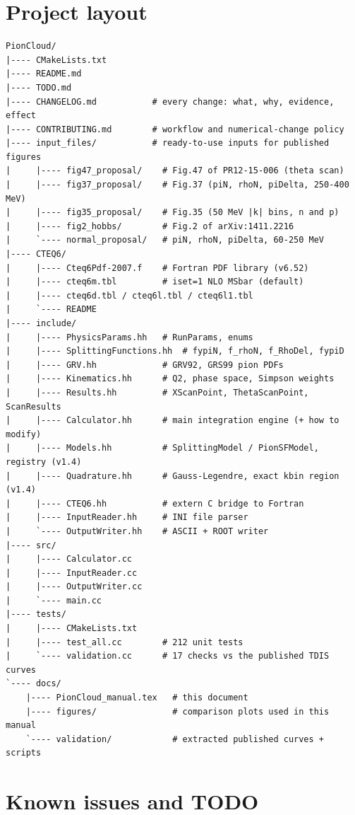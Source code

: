 \documentclass[11pt,a4paper]{article}
\begin{document}
\section{Project layout}

\begin{lstlisting}[style=bashstyle]
PionCloud/
|---- CMakeLists.txt
|---- README.md
|---- TODO.md
|---- CHANGELOG.md           # every change: what, why, evidence, effect
|---- CONTRIBUTING.md        # workflow and numerical-change policy
|---- input_files/           # ready-to-use inputs for published figures
|     |---- fig47_proposal/    # Fig.47 of PR12-15-006 (theta scan)
|     |---- fig37_proposal/    # Fig.37 (piN, rhoN, piDelta, 250-400 MeV)
|     |---- fig35_proposal/    # Fig.35 (50 MeV |k| bins, n and p)
|     |---- fig2_hobbs/        # Fig.2 of arXiv:1411.2216
|     `---- normal_proposal/   # piN, rhoN, piDelta, 60-250 MeV
|---- CTEQ6/
|     |---- Cteq6Pdf-2007.f    # Fortran PDF library (v6.52)
|     |---- cteq6m.tbl         # iset=1 NLO MSbar (default)
|     |---- cteq6d.tbl / cteq6l.tbl / cteq6l1.tbl
|     `---- README
|---- include/
|     |---- PhysicsParams.hh   # RunParams, enums
|     |---- SplittingFunctions.hh  # fypiN, f_rhoN, f_RhoDel, fypiD
|     |---- GRV.hh             # GRV92, GRS99 pion PDFs
|     |---- Kinematics.hh      # Q2, phase space, Simpson weights
|     |---- Results.hh         # XScanPoint, ThetaScanPoint, ScanResults
|     |---- Calculator.hh      # main integration engine (+ how to modify)
|     |---- Models.hh          # SplittingModel / PionSFModel, registry (v1.4)
|     |---- Quadrature.hh      # Gauss-Legendre, exact kbin region (v1.4)
|     |---- CTEQ6.hh           # extern C bridge to Fortran
|     |---- InputReader.hh     # INI file parser
|     `---- OutputWriter.hh    # ASCII + ROOT writer
|---- src/
|     |---- Calculator.cc
|     |---- InputReader.cc
|     |---- OutputWriter.cc
|     `---- main.cc
|---- tests/
|     |---- CMakeLists.txt
|     |---- test_all.cc        # 212 unit tests
|     `---- validation.cc      # 17 checks vs the published TDIS curves
`---- docs/
    |---- PionCloud_manual.tex   # this document
    |---- figures/               # comparison plots used in this manual
    `---- validation/            # extracted published curves + scripts
\end{lstlisting}

\section{Known issues and TODO}
\end{document}
